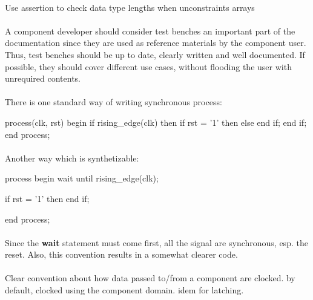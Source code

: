 \documentclass[12pt]{article}
\begin{document}

\paragraph{}
Use assertion to check data type lengths when unconstraints
arrays



\paragraph{}
A component developer should consider test benches an important
part of the documentation since they are used as reference
materials by the component user. Thus, test benches should be up
to date, clearly written and well documented. If possible, they
should cover different use cases, without flooding the user with
unrequired contents.



\paragraph{}
There is one standard way of writing synchronous process:
\begin{vhdl}
process(clk, rst)
begin
 if rising_edge(clk) then
  if rst = '1' then
  else
  end if;
 end if;
end process;
\end{vhdl}

\paragraph{}
Another way which is synthetizable:
\begin{vhdl}
process
begin
 wait until rising_edge(clk);

 if rst = '1' then
 end if;

end process;
\end{vhdl}

\paragraph{}
Since the \textbf{wait} statement must come first, all the signal
are synchronous, esp. the reset. Also, this convention results in
a somewhat clearer code.



\paragraph{}
Clear convention about how data passed to/from a component are
clocked. by default, clocked using the component domain. idem for
latching.
\end{document}

